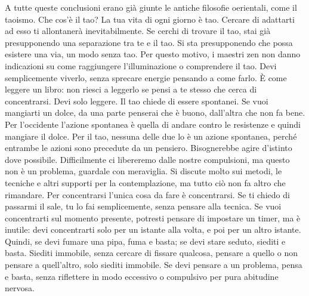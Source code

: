 \documentclass[12pt]{book} %
\begin{document}
A tutte queste conclusioni erano già giunte le antiche filosofie oerientali, come il taoismo.
Che cos'è il tao? La tua vita di ogni giorno è tao. Cercare di adattarti ad esso ti allontanerà inevitabilmente. Se cerchi di trovare il tao, stai già presupponendo una separazione tra te e il tao. Si sta presupponendo che possa esistere una via, un modo senza tao. Per questo motivo, i maestri zen non danno indicazioni su come raggiungere l'illuminazione o comprendere il tao. Devi semplicemente viverlo, senza sprecare energie pensando a come farlo. È come leggere un libro: non riesci a leggerlo se pensi a te stesso che cerca di concentrarsi. Devi solo leggere.
Il tao chiede di essere spontanei. Se vuoi mangiarti un dolce, da una parte penserai che è buono, dall'altra che non fa bene. Per l'occidente l'azione spontanea è quella di andare contro le resistenze e quindi mangiare il dolce. Per il tao, nessuna delle due lo è un azione spontanea, perché entrambe le azioni sono precedute da un pensiero. Bisognerebbe agire d'istinto dove possibile. Difficilmente ci libereremo dalle nostre compulsioni, ma questo non è un problema, guardale con meraviglia.
Si discute molto sui metodi, le tecniche e altri supporti per la contemplazione, ma tutto ciò non fa altro che rimandare. Per concentrarsi l'unica cosa da fare è concentrarsi. Se ti chiedo di passarmi il sale, tu lo fai semplicemente, senza pensare alla tecnica. Se vuoi concentrarti sul momento presente, potresti pensare di impostare un timer, ma è inutile: devi concentrarti solo per un istante alla volta, e poi per un altro istante. Quindi, se devi fumare una pipa, fuma e basta; se devi stare seduto, siediti e basta. Siediti immobile, senza cercare di fissare qualcosa, pensare a quello o non pensare a quell'altro, solo siediti immobile. Se devi pensare a un problema, pensa e basta, senza riflettere in modo eccessivo o compulsivo per pura abitudine nervosa.
\end{document}
